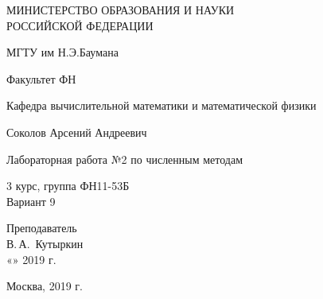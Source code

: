 \documentclass[14pt,a4paper]{scrartcl}
\begin{document}
	\begin{titlepage}
	\begin{center}
		\large
		МИНИСТЕРСТВО ОБРАЗОВАНИЯ И НАУКИ\\ РОССИЙСКОЙ ФЕДЕРАЦИИ
		
		\vspace{0.5cm}
		
		МГТУ им Н.Э.Баумана
		\vspace{0.25cm}
		
		Факультет ФН
		
		Кафедра вычислительной математики и математической физики
		\vfill
		
		
		Соколов Арсений Андреевич\\
		\vfill
		
		
		{\LARGE Лабораторная работа №2 по численным методам\\[2mm]
		}
		\bigskip
		
		3 курс, группа ФН11-53Б\\
		Вариант 9
	\end{center}
	\vfill
	
	\newlength{\ML}
	\hfill\begin{minipage}{0.4\textwidth}
		Преподаватель\\
		\underline{\hspace{3cm}} В.\,А.~Кутыркин\\
		«\underline{\hspace{0.7cm}}» \underline{\hspace{1.71cm}} 2019 г.
	\end{minipage}%
	\bigskip
	
	
	\vfill
	
	\begin{center}
		Москва, 2019 г.
	\end{center}
\end{titlepage}
\end{document}
